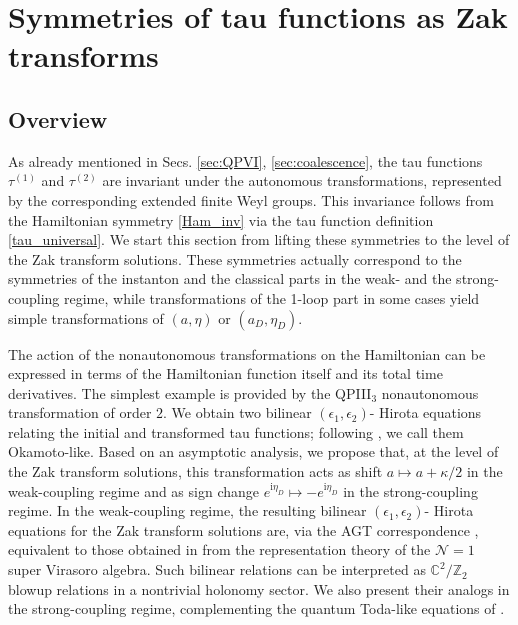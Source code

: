 \documentclass[12pt,a4paper]{article}
\numberwithin{equation}{section}
\newcommand{\ri}{\mathrm{i}}
\newcommand{\D}{\scriptscriptstyle{D}}
\begin{document}
\section{Symmetries of tau functions as Zak transforms}
\label{sec:tau_symm}

\setcounter{subsection}{-1}

\subsection{Overview}
As already mentioned in Secs. \ref{sec:QPVI}, \ref{sec:coalescence}, the tau functions $\tau^{(1)}$ and $\tau^{(2)}$ are invariant under the autonomous transformations, represented by the corresponding extended finite Weyl groups. This invariance follows from the Hamiltonian symmetry \eqref{Ham_inv} via the tau function definition \eqref{tau_universal}. We start this section from lifting these symmetries to the level of the Zak transform solutions. These symmetries actually correspond to the symmetries of the instanton and the classical parts in the weak- and the strong-coupling regime, while
transformations of the 1-loop part in some cases yield simple transformations of $(a,\eta)$ or $(a_{\D},\eta_{\D})$.

The action of the nonautonomous transformations on the Hamiltonian can be expressed in terms of the Hamiltonian function itself and its total time derivatives. The simplest example is provided by the QPIII$_3$ nonautonomous transformation of order $2$. We obtain two bilinear $(\epsilon_1,\epsilon_2)$- Hirota equations relating the initial and transformed tau functions; following \cite{BS16b}, we call them Okamoto-like. Based on an asymptotic analysis, we propose that, at the level of the Zak transform solutions, this transformation acts as shift $a\mapsto a+\kappa/2$ in the weak-coupling regime and as sign change $e^{\ri\eta_{\D}}\mapsto -e^{\ri\eta_{\D}}$ in the strong-coupling regime. 
In the weak-coupling regime, the resulting bilinear $(\epsilon_1,\epsilon_2)$- Hirota equations for the Zak transform solutions are, via the AGT correspondence \cite{AGT09}, equivalent to those obtained in \cite{BS16b} from the representation theory of the $\mathcal{N}=1$ super Virasoro algebra. Such 
bilinear relations can be interpreted as $\mathbb{C}^2/\mathbb{Z}_2$ blowup relations in a nontrivial holonomy sector. We also present their analogs in the strong-coupling regime, complementing the quantum Toda-like equations of \cite[Sec.~7]{GMS20}.
\end{document}
